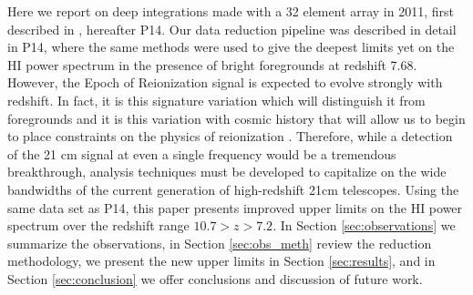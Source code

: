 \documentclass{aastex}
\begin{document}
Here we report on deep integrations made with a 32 element array in 2011, first described in \cite{Parsons:2014p10499}, hereafter P14.  Our data reduction pipeline was described in detail in P14, where the same methods were used to give the deepest limits yet on the HI power spectrum in the presence of bright foregrounds at redshift 7.68.  However, the Epoch of Reionization signal is expected to evolve strongly with redshift. In fact, it is this signature variation which will distinguish it from foregrounds and it is this variation with cosmic history that will allow us to begin to place constraints on the physics of reionization \citep{Pritchard:2008p8123,Pober:2014p10390}.  Therefore, while a detection of the 21 cm signal at even a single frequency would be a tremendous breakthrough, analysis techniques must be developed to capitalize on the wide bandwidths of the current generation of high-redshift 21cm telescopes.  Using the same data set as P14, this paper presents improved upper limits on the HI power spectrum over the redshift range $10.7>z>7.2$.  In Section  \ref{sec:observations} we summarize the observations, in Section \ref{sec:obs_meth} review the reduction methodology, we present the new upper limits in Section \ref{sec:results}, and in Section \ref{sec:conclusion} we offer conclusions and discussion of future work.



%


\end{document}
